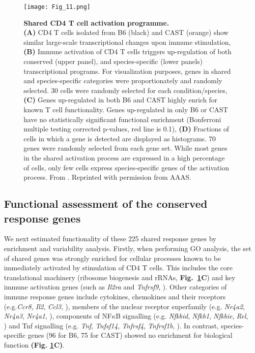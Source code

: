 \begin{figure}[!ht]
\centering
\texttt{[image: Fig\_11.png]}
\caption[Shared CD4\plus{} T cell activation programme]{\textbf{Shared CD4\plus{} T cell activation programme.}\\
\textbf{(A)} CD4\plus{} T cells isolated from B6 (black) and CAST (orange) show similar large-scale transcriptional changes upon immune stimulation, \textbf{(B)} Immune activation of CD4\plus{} T cells triggers up-regulation of both conserved (upper panel), and species-specific (lower panels) transcriptional programs. For visualization purposes, genes in shared and species-specific categories were proportionately and randomly selected. 30 cells were randomly selected for each condition/species, \textbf{(C)} Genes up-regulated in both B6 and CAST highly enrich for known T cell functionality. Genes up-regulated in only B6 or CAST have no statistically significant functional enrichment (Bonferroni multiple testing corrected p-values, red line is 0.1), \textbf{(D)} Fractions of cells in which a gene is detected are displayed as histograms. 70 genes were randomly selected from each gene set. While most genes in the shared activation process are expressed in a high percentage of cells, only few cells express species-specific genes of the activation process. From \citep{Martinez-jimenez2017}. Reprinted with permission from AAAS.}
\label{fig1:shared_activation}
\end{figure}

\newpage

\subsection{Functional assessment of the conserved response genes}

We next estimated functionality of these 225 shared response genes by enrichment and variability analysis. Firstly, when performing GO analysis, the set of shared genes was strongly enriched for cellular processes known to be immediately activated by stimulation of CD4\plus{} T cells. This includes the core translational machinery (ribosome biogenesis and rRNAs, \textbf{Fig.~\ref{fig1:shared_activation}C}) and key immune activation genes (such as \textit{Il2ra} and \textit{Tnfrsf9}, \citep{Asmal2003}). Other categories of immune response genes include cytokines, chemokines and their receptors (e.g.\textit{Ccr8}, \textit{Il2}, \textit{Ccl3}, \citep{Turner2014}), members of the nuclear receptor superfamily (e.g. \textit{Nr4a2}, \textit{Nr4a3}, \textit{Nr4a1}, \citep{Glass2010}), components of NF$\kappa$B signalling (e.g. \textit{Nfkbid}, \textit{Nfkb1}, \textit{Nfkbie}, \textit{Rel}, \citep{Gerondakis2010}) and Tnf signalling (e.g. \textit{Tnf}, \textit{Tnfsf14}, \textit{Tnfrsf4}, \textit{Tnfrsf1b}, \citep{Croft2009}). In contrast, species-specific genes (96 for B6, 75 for CAST) showed no enrichment for biological function \textbf{(Fig. \ref{fig1:shared_activation}C)}. \\

